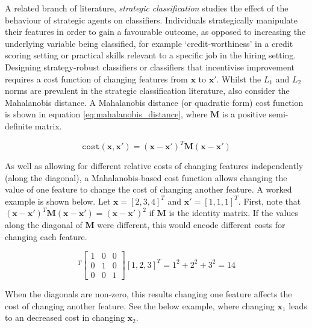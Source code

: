 A related branch of literature, \textit{strategic classification} studies the effect of the behaviour of strategic agents on classifiers. Individuals strategically manipulate their features in order to gain a favourable outcome, as opposed to increasing the underlying variable being classified, for example `credit-worthiness' in a credit scoring setting or practical skills relevant to a specific job in the hiring setting. Designing strategy-robust classifiers or classifiers that incentivise improvement requires a cost function of changing features from $\mathbf{x}$ to $\mathbf{x}'$. Whilst the  $L_1$ and $L_2$ norms are prevalent in the strategic classification literature, \textcite{bechavodInformationDiscrepancyStrategic2022} also consider the Mahalanobis distance. A Mahalanobis distance (or quadratic form) cost function is shown in equation \ref{eq:mahalanobis_distance}, where $\mathbf{M}$ is a positive semi-definite matrix. 

\begin{equation} \label{eq:mahalanobis_distance}
	\texttt{cost}(\mathbf{x}, \mathbf{x}') = (\mathbf{x} -\mathbf{x}')^T\mathbf{M}(\mathbf{x} - \mathbf{x}')
\end{equation}

As well as allowing for different relative costs of changing features independently (along the diagonal), a Mahalanobis-based cost function allows changing the value of one feature to change the cost of changing another feature. A worked example is shown below. Let $\mathbf{x} = [2,3,4]^T$ and $\mathbf{x}' = [1,1,1]^T$. First, note that $(\mathbf{x} -\mathbf{x}')^T\mathbf{M}(\mathbf{x} - \mathbf{x}') = (\mathbf{x} -\mathbf{x}')^2$ if $\mathbf{M}$ is the identity matrix. If the values along the diagonal of $\mathbf{M}$ were different, this would encode different costs for changing each feature.

\begin{equation}
	[1, 2, 3]^T \left[\begin{array}{lllll}
		1 & 0 & 0 \\
		0 & 1 & 0 \\
		0 & 0 & 1
	\end{array}\right] [1, 2, 3]^T = 1^2 + 2^2 + 3^2 = 14
\end{equation}

When the diagonals are non-zero, this results changing one feature affects the cost of changing another feature. See the below example, where changing $\mathbf{x}_1$ leads to an decreased cost in changing $\mathbf{x}_2$.

